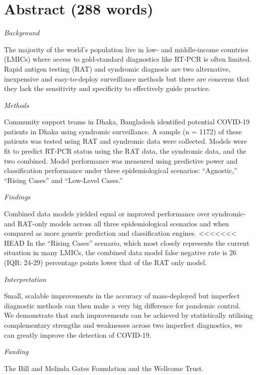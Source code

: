 \documentclass[]{elsarticle} %
\begin{document}
\hypertarget{abstract-288-words}{%
\section{Abstract (288 words)}\label{abstract-288-words}}

\emph{Background}

The majority of the world's population live in low- and middle-income countries (LMICs) where access to gold-standard diagnostics like RT-PCR is often limited.
Rapid antigen testing (RAT) and syndromic diagnosis are two alternative, inexpensive and easy-to-deploy surveillance methods but there are concerns that they lack the sensitivity and specificity to effectively guide practice.

\emph{Methods}

Community support teams in Dhaka, Bangladesh identified potential COVID-19 patients in Dhaka using syndromic surveillance.
A sample (n = 1172) of these patients was tested using RAT and syndromic data were collected.
Models were fit to predict RT-PCR status using the RAT data, the syndromic data, and the two combined.
Model performance was measured using predictive power and classification performance under three epidemiological scenarios: ``Agnostic,'' ``Rising Cases'' and ``Low-Level Cases.''

\emph{Findings}

Combined data models yielded equal or improved performance over syndromic- and RAT-only models across all three epidemiological scenarios and when compared as more generic prediction and classification engines.
\textless\textless\textless\textless\textless\textless\textless{} HEAD
In the ``Rising Cases'' scenario, which most closely represents the current situation in many LMICs, the combined data model false negative rate is 26 (IQR: 24-29) percentage points lower that of the RAT only model.

\emph{Interpretation}

Small, scalable improvements in the accuracy of mass-deployed but imperfect diagnostic methods can then make a very big difference for pandemic control.\\
We demonstrate that such improvements can be achieved by statistically utilising complementary strengths and weaknesses across two imperfect diagnostics, we can greatly improve the detection of COVID-19.

\emph{Funding}

The Bill and Melinda Gates Foundation and the Wellcome Trust.
\end{document}
